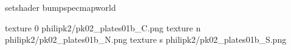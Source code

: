 setshader bumpspecmapworld

texture 0 philipk2/pk02_plates01b_C.png
texture n philipk2/pk02_plates01b_N.png
texture s philipk2/pk02_plates01b_S.png

